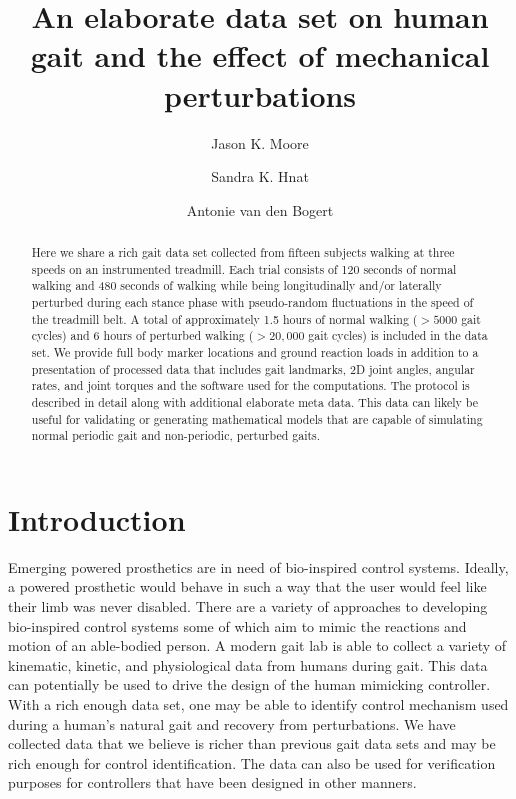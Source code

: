 \documentclass[10pt,a4paper,twocolumn]{article}
\begin{document}
\title{An elaborate data set on human gait and the effect of mechanical
  perturbations}

\author[1]{Jason K. Moore}
\author[1]{Sandra K. Hnat}
\author[1]{Antonie van den Bogert}


\maketitle
\thispagestyle{fancy}

\begin{abstract}

  Here we share a rich gait data set collected from fifteen subjects walking at
  three speeds on an instrumented treadmill. Each trial consists of 120 seconds
  of normal walking and 480 seconds of walking while being longitudinally
  and/or laterally perturbed during each stance phase with pseudo-random
  fluctuations in the speed of the treadmill belt. A total of approximately 1.5
  hours of normal walking ($>5000$ gait cycles) and 6 hours of perturbed walking
  ($>20,000$ gait cycles) is included in the data set. We provide full body
  marker locations and ground reaction loads in addition to a presentation of
  processed data that includes gait landmarks, 2D joint angles, angular rates,
  and joint torques and the software used for the computations. The protocol is
  described in detail along with additional elaborate meta data. This data can
  likely be useful for validating or generating mathematical models that are
  capable of simulating normal periodic gait and non-periodic, perturbed gaits.

\end{abstract}
\clearpage

\section*{Introduction}
%
Emerging powered prosthetics are in need of bio-inspired control systems.
Ideally, a powered prosthetic would behave in such a way that the user would
feel like their limb was never disabled. There are a variety of approaches to
developing bio-inspired control systems some of which aim to mimic the
reactions and motion of an able-bodied person. A modern gait lab is able to
collect a variety of kinematic, kinetic, and physiological data from humans
during gait. This data can potentially be used to drive the design of the human
mimicking controller. With a rich enough data set, one may be able to identify
control mechanism used during a human's natural gait and recovery from
perturbations. We have collected data that we believe is richer than previous
gait data sets and may be rich enough for control identification. The data can
also be used for verification purposes for controllers that have been designed
in other manners.
\end{document}
